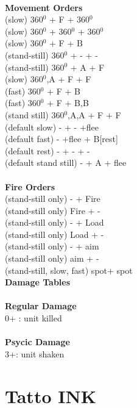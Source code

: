 \ \\ {\bf Movement Orders } \\
(slow) 360$^0$ + F + 360$^0$ \\
(slow) 360$^0$ + 360$^0$ + 360$^0$ \\
(slow) 360$^0$ + F + B \\
(stand-still) 360$^0$ + - + - \\
(stand-still) 360$^0$ + A + F \\
(slow) 360$^0$,A + F + F \\
(fast) 360$^0$ + F + B \\
(fast) 360$^0$ + F + B,B \\
(stand still) 360$^0$,A,A + F + F \\
(default slow) - + - +flee \\
(default fast) - +flee + B[rest] \\
(default rest) - + - + - \\
(default stand still) - + A + flee \\
\ \\ {\bf Fire Orders } \\
(stand-still only) - + Fire \\
(stand-still only) Fire + -  \\
(stand-still only) - + Load \\
(stand-still only) Load + - \\
(stand-still only) - + aim \\
(stand-still only) aim + -  \\
(stand-still, slow, fast) spot+ spot \\



{\bf Damage Tables} \\
\ \\ {\bf Regular Damage } \\
0+ : unit killed \\
\ \\ {\bf Psycic Damage } \\
3+: unit shaken \\









\pagebreak

\section{ Tatto INK }

